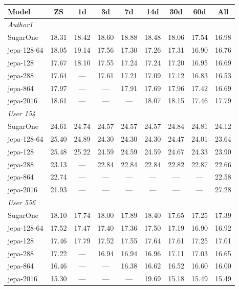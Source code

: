 \documentclass[11pt,a4paper]{article}
\begin{document}
\begin{table}[h]
\centering
\scriptsize
\setlength{\tabcolsep}{3.5pt}
\begin{tabular}{lcccccccc}
\toprule
Model & ZS & 1d & 3d & 7d & 14d & 30d & 60d & All \\
\midrule
\multicolumn{9}{l}{\textit{Author1}} \\
SugarOne & 18.31 & 18.42 & 18.60 & 18.88 & 18.48 & 18.06 & 17.54 & 16.98 \\
jepa-128-64 & 18.05 & 19.14 & 17.56 & 17.30 & 17.26 & 17.31 & 16.90 & 16.76 \\
jepa-128 & 17.67 & 18.10 & 17.55 & 17.24 & 17.24 & 17.20 & 16.95 & 16.69 \\
jepa-288 & 17.64 & --- & 17.61 & 17.21 & 17.09 & 17.12 & 16.83 & 16.53 \\
jepa-864 & 17.97 & --- & --- & 17.91 & 17.69 & 17.96 & 17.42 & 16.69 \\
jepa-2016 & 18.61 & --- & --- & --- & 18.07 & 18.15 & 17.46 & 17.79 \\
\midrule
\multicolumn{9}{l}{\textit{User 154}} \\
SugarOne & 24.61 & 24.74 & 24.57 & 24.57 & 24.57 & 24.84 & 24.81 & 24.12 \\
jepa-128-64 & 25.40 & 24.89 & 24.30 & 24.30 & 24.30 & 24.47 & 24.01 & 23.64 \\
jepa-128 & 25.48 & 25.22 & 24.59 & 24.59 & 24.59 & 24.67 & 24.33 & 23.90 \\
jepa-288 & 23.13 & --- & 22.84 & 22.84 & 22.84 & 22.82 & 22.87 & 22.66 \\
jepa-864 & 22.74 & --- & --- & --- & --- & --- & --- & 22.58 \\
jepa-2016 & 21.93 & --- & --- & --- & --- & --- & --- & 27.28 \\
\midrule
\multicolumn{9}{l}{\textit{User 556}} \\
SugarOne & 18.10 & 17.74 & 18.00 & 17.89 & 18.40 & 17.65 & 17.25 & 17.39 \\
jepa-128-64 & 17.52 & 17.47 & 17.40 & 17.36 & 17.50 & 17.19 & 16.90 & 16.92 \\
jepa-128 & 17.46 & 17.79 & 17.52 & 17.55 & 17.64 & 17.61 & 17.25 & 17.01 \\
jepa-288 & 17.22 & --- & 16.94 & 16.94 & 16.96 & 17.11 & 17.03 & 16.65 \\
jepa-864 & 16.46 & --- & --- & 16.38 & 16.62 & 16.52 & 16.60 & 16.00 \\
jepa-2016 & 15.30 & --- & --- & --- & 19.69 & 15.18 & 15.49 & 15.49 \\
\midrule

\end{tabular}
\end{table}
\end{document}
